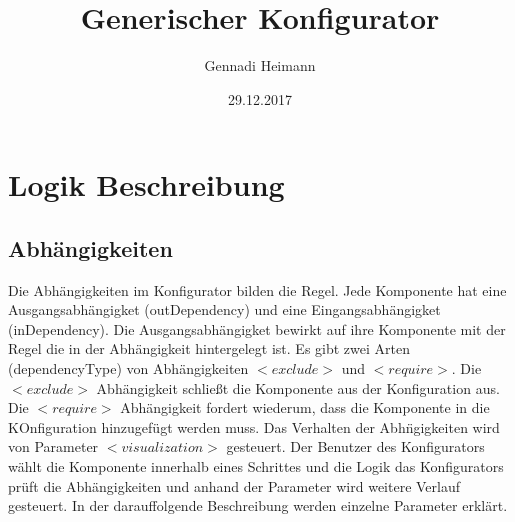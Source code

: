 \documentclass{article}
\begin{document}
\begin{titlepage}

\author{Gennadi Heimann} 
\title{Generischer Konfigurator} 
\date{29.12.2017} 
\maketitle
\end{titlepage}

\section{Logik Beschreibung}

\subsection{Abh{\"a}ngigkeiten}

Die Abh\"angigkeiten im Konfigurator bilden die Regel. Jede Komponente hat eine
Ausgangsabh\"angigket (outDependency) und eine Eingangsabh\"angigket
(inDependency). Die Ausgangsabh\"angigket bewirkt auf ihre Komponente mit der
Regel die in der Abh\"angigkeit hintergelegt ist. 
Es gibt zwei Arten (dependencyType) von Abh\"angigkeiten $<exclude>$ und
$<require>$. Die $<exclude>$ Abh\"angigkeit schlie\ss{}t die Komponente aus der
Konfiguration aus. Die $<require>$ Abh\"angigkeit fordert wiederum, dass die
Komponente in die KOnfiguration hinzugef\"ugt werden muss. Das Verhalten der
Abh\"ngigkeiten wird von Parameter $<visualization>$ gesteuert. Der Benutzer
des Konfigurators w\"ahlt die Komponente innerhalb eines Schrittes und die
Logik das Konfigurators pr\"uft die Abh\"angigkeiten und anhand der Parameter
wird weitere Verlauf gesteuert. In der darauffolgende Beschreibung werden
einzelne Parameter erkl\"art.
\end{document}
